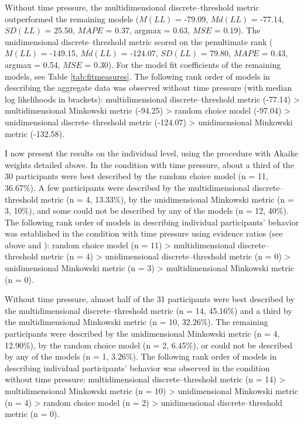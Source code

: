 \documentclass[a4paper,man,natbib]{apa6}
\begin{document}
Without time pressure, the multidimensional discrete--threshold metric outperformed the remaining models ($M(LL)$ = -79.09, $Md(LL)$ = -77.14, $SD(LL)$ = 25.50, $MAPE$ = 0.37, argmax = 0.63, $MSE$ = 0.19). The unidimensional discrete--threshold metric scored on the penultimate rank ($M(LL)$ = -149.15, $Md(LL)$ = -124.07, $SD(LL)$ = 79.80, $MAPE$ = 0.43, argmax = 0.54, $MSE$ = 0.30). For the model fit coefficients of the remaining models, see Table \ref{tab:fitmeasures}. The following rank order of models in describing the aggregate data was observed without time pressure (with median log likelihoods in brackets): multidimensional discrete--threshold metric (-77.14) > multidimensional Minkowski metric (-94.25) > random choice model (-97.04) > unidimensional discrete--threshold metric (-124.07) > unidimensional Minkowski metric (-132.58).

I now present the results on the individual level, using the procedure with Akaike weights detailed above. In the condition with time pressure, about a third of the 30 participants were best described by the random choice model (n = 11, 36.67\%). A few participants were described by the multidimensional discrete--threshold metric (n = 4, 13.33\%), by the unidimensional Minkowski metric (n = 3, 10\%), and some could not be described by any of the models (n = 12, 40\%). The following rank order of models in describing individual participants' behavior was established in the condition with time pressure using evidence ratios (see above and \citealp{wagenmakers2004aic}): random choice model (n = 11) > multidimensional discrete--threshold metric (n = 4) > unidimensional discrete--threshold metric (n = 0) > unidimensional Minkowski metric (n = 3) > multidimensional Minkowski metric (n = 0). 

Without time pressure, almost half of the 31 participants were best described by the multidimensional discrete--threshold metric (n = 14, 45.16\%) and a third by the multidimensional Minkowski metric (n = 10, 32.26\%). The remaining participants were described by the unidimensional Minkowski metric (n = 4, 12.90\%), by the random choice model (n = 2, 6.45\%), or could not be described by any of the models (n = 1, 3.26\%). The following rank order of models in describing individual participants' behavior was observed in the condition without time pressure: multidimensional discrete--threshold metric (n = 14) > multidimensional Minkowski metric (n = 10) > unidimensional Minkowski metric (n = 4) > random choice model (n = 2) > unidimensional discrete--threshold metric (n = 0).
\end{document}
